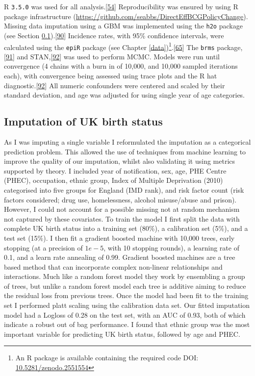 \documentclass[11pt,twoside]{bristolthesis}
\begin{document}
  R \texttt{3.5.0} was used for all analysis.{[}\protect\hyperlink{ref-R}{54}{]} Reproducibility was ensured by using R package infrastructure (\url{https://github.com/seabbs/DirectEffBCGPolicyChange}). Missing data imputation using a GBM was implemented using the \texttt{h2o} package (see Section \ref{imp-uk-birth-status}).{[}\protect\hyperlink{ref-h2o2018}{90}{]} Incidence rates, with 95\% confidence intervals, were calculated using the \texttt{epiR} package (see Chapter \ref{data})\footnote{An R package is available containing the required code DOI: \href{https://zenodo.org/badge/latestdoi/93072437}{10.5281/zenodo.2551554}}.{[}\protect\hyperlink{ref-EpiR}{65}{]} The \texttt{brms} package,{[}\protect\hyperlink{ref-Burkner}{91}{]} and STAN,{[}\protect\hyperlink{ref-StanDevelopmentTeam2016}{92}{]} was used to perform MCMC. Models were run until convergence (4 chains with a burn in of 10,000, and 10,000 sampled iterations each), with convergence being assessed using trace plots and the R hat diagnostic.{[}\protect\hyperlink{ref-StanDevelopmentTeam2016}{92}{]} All numeric confounders were centered and scaled by their standard deviation, and age was adjusted for using single year of age categories.
  
  \hypertarget{imp-uk-birth-status}{%
  \subsection{Imputation of UK birth status}\label{imp-uk-birth-status}}
  
  As I was imputing a single variable I reformulated the imputation as a categorical prediction problem. This allowed the use of techniques from machine learning to improve the quality of our imputation, whilst also validating it using metrics supported by theory. I included year of notification, sex, age, PHE Centre (PHEC), occupation, ethnic group, Index of Multiple Deprivation (2010) categorised into five groups for England (IMD rank), and risk factor count (risk factors considered; drug use, homelessness, alcohol misuse/abuse and prison). However, I could not account for a possible missing not at random mechanism not captured by these covariates. To train the model I first split the data with complete UK birth status into a training set (80\%), a calibration set (5\%), and a test set (15\%). I then fit a gradient boosted machine with 10,000 trees, early stopping (at a precision of \(1e-5\), with 10 stopping rounds), a learning rate of 0.1, and a learn rate annealing of 0.99. Gradient boosted machines are a tree based method that can incorporate complex non-linear relationships and interactions. Much like a random forest model they work by ensembling a group of trees, but unlike a random forest model each tree is additive aiming to reduce the residual loss from previous trees. Once the model had been fit to the training set I performed platt scaling using the calibration data set. Our fitted imputation model had a Logloss of 0.28 on the test set, with an AUC of 0.93, both of which indicate a robust out of bag performance. I found that ethnic group was the most important variable for predicting UK birth status, followed by age and PHEC.
  
\end{document}
